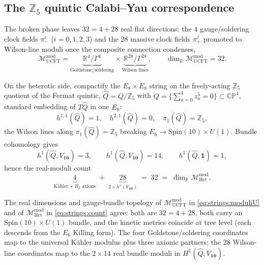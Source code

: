 \subsection{The $\mathbb{Z}_{5}$ quintic Calabi--Yau correspondence}
\label{sec:strings:cy}

The broken phase leaves $32 = 4+28$ real flat directions: the $4$
gauge/soldering clock fields $\pi_{-}^{i}$ ($i=0,1,2,3$) and the $28$
massive clock fields $\pi_{+}^{j}$ promoted to Wilson-line moduli once
the composite connection condenses,
\begin{equation}
  \mathcal{M}^{\mathrm{mod}}_{\mathrm{UCFT}}
   = \underbrace{\mathbb{R}^{4}/\Gamma^{4}}_{\text{Goldstone/soldering}}
     \times
     \underbrace{\mathbb{R}^{28}/\Gamma^{28}}_{\text{Wilson lines}},
   \qquad
   \dim_{\mathbb{R}}\mathcal{M}^{\mathrm{mod}}_{\mathrm{UCFT}}=32.
  \label{eq:strings:moduliU}
\end{equation}

On the heterotic side, compactify the $E_{8}\times E_{8}$ string on the
freely-acting $\mathbb{Z}_{5}$ quotient of the Fermat quintic,
$\widehat{Q}=Q/\mathbb{Z}_{5}$ with
$Q=\{\sum_{a=0}^{4}z_{a}^{5}=0\}\subset\mathbb{CP}^{4}$, standard
embedding of $T\widehat{Q}$ in one $E_{8}$:
\begin{equation}
  h^{1,1}(\widehat{Q})=1,\quad
  h^{2,1}(\widehat{Q})=0,\quad
  \pi_{1}(\widehat{Q})=\mathbb{Z}_{5},
  \label{eq:strings:hodge}
\end{equation}
the Wilson lines along $\pi_{1}(\widehat{Q})=\mathbb{Z}_{5}$ breaking
$E_{6}\to\mathrm{Spin}(10)\times U(1)$. Bundle cohomology gives
\begin{equation}
  h^{1}(\widehat{Q},V_{\mathbf{16}})=3,\qquad
  h^{1}(\widehat{Q},V_{\mathbf{10}})=14,\qquad
  h^{1}(\widehat{Q},\mathbf{1})=1,
  \label{eq:strings:bundle}
\end{equation}
hence the real-moduli count
\begin{equation}
  \underbrace{4}_{\text{K\"ahler}+B_{2}\text{ axions}}
  \;+\;
  \underbrace{28}_{2\times h^{1}(V_{\mathbf{10}})}
  \;=\;32
  \;=\;\dim_{\mathbb{R}}\mathcal{M}^{\mathrm{mod}}_{\mathrm{Het}} .
  \label{eq:strings:count}
\end{equation}

\begin{theorem}
\label{thm:strings:moduli}
The real dimensions and gauge-bundle topology of
$\mathcal{M}^{\mathrm{mod}}_{\mathrm{UCFT}}$ in
\eqref{eq:strings:moduliU} and of
$\mathcal{M}^{\mathrm{mod}}_{\mathrm{Het}}$ in \eqref{eq:strings:count}
agree: both are $32 = 4+28$, both carry an
$\mathrm{Spin}(10)\times U(1)$ bundle, and the kinetic metrics coincide
at tree level (each descends from the $E_{6}$ Killing form). The four
Goldstone/soldering coordinates map to the universal K\"ahler modulus
plus three axionic partners; the $28$ Wilson-line coordinates map to the
$2\times 14$ real bundle moduli in $H^{1}(\widehat{Q},V_{\mathbf{10}})$.
\end{theorem}

